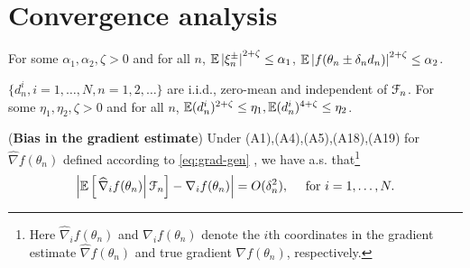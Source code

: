 \section{Convergence analysis}
\label{sec:2rdsa-gen-results}
\begin{pvn}
\item For some $\alpha_1, \alpha_2,\zeta >0$ and for all $n$, 
$\mathbb{E} \left|\xi_n^{\pm}\right|^{2+\zeta} \le \alpha_1$, $\mathbb{E} \left|f(\theta_n\pm \delta_n d_n)\right|^{2+\zeta} \le \alpha_2$. 
\item $\{d_n^i, i=1,\ldots,N, n=1,2,\ldots\}$ are i.i.d., zero-mean and independent of $\mathcal{F}_n$. For some $\eta_1,\eta_2,\zeta >0$ and for all $n$, $\mathbb{E}(d_n^i)^{2+\zeta} \le \eta_1,\mathbb{E}(d_n^i)^{4+\zeta} \le \eta_2$.
\end{pvn}


\begin{lemma}(\textbf{Bias in the gradient estimate})
\label{lemma:1rdsa-bias}
Under (A1),(A4),(A5),(A18),(A19) for $\widehat\nabla f(\theta_n)$ defined according to  \eqref{eq:grad-gen} , we have a.s. that\footnote{Here $\widehat\nabla_i f(\theta_n)$ and $\nabla_i f(\theta_n)$ denote the $i$th coordinates in the gradient estimate $\widehat\nabla f(\theta_n)$ and true gradient $\nabla f(\theta_n)$, respectively.}
\begin{align}
 \left| \mathbb{E}\left[\left.\widehat\nabla_i f(\theta_n)\right| \mathcal{F}_n \right] - \nabla_i f(\theta_n)\right| = O(\delta_n^2),  \quad \text{ for } i=1,\ldots,N.
\end{align} 
\end{lemma}

